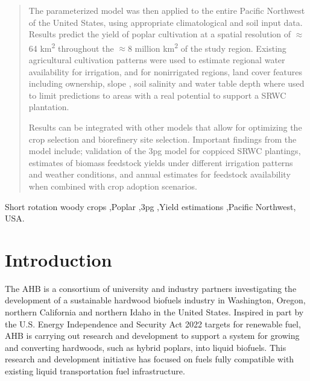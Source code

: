 \documentclass[preprint,12pt]{elsarticle}
\begin{document}
\begin{frontmatter}
\begin{abstract}
  The parameterized model was then applied to the entire Pacific
  Northwest of the United States, using appropriate climatological and
  soil input data.  Results predict the yield of poplar cultivation at
  a spatial resolution of $\approx$ 64 km\textsuperscript{2}
  throughout the $\approx$8 million km\textsuperscript{2} of the study
  region. Existing agricultural cultivation patterns were used to
  estimate regional water availability for irrigation, and for
  nonirrigated regions, land cover features including ownership, slope
  , soil salinity and water table depth where used to limit
  predictions to areas with a real potential to support a \ac{SRWC}
  plantation.

  Results can be integrated with other models that allow for
  optimizing the crop selection and biorefinery site selection.
  Important findings from the model include; validation of the
  \ac{3pg} model for coppiced \ac{SRWC} plantings, estimates of
  biomass feedstock yields under different irrigation patterns and
  weather conditions, and annual estimates for feedstock availability
  when combined with crop adoption scenarios.

\end{abstract}

\begin{keyword}
  Short rotation woody crops \sep Poplar \sep \ac{3pg} \sep Yield
  estimations \sep Pacific Northwest, USA.



\end{keyword}

\end{frontmatter}


\section{Introduction}
\label{sec:introduction}
The \acf{AHB} is a consortium of university and industry partners
investigating the development of a sustainable hardwood biofuels
industry in Washington, Oregon, northern California and northern Idaho
in the United States.  Inspired in part by the U.S. Energy Independence and
Security Act 2022 targets for renewable fuel, \ac{AHB} is carrying out
research and development to support a system for growing and
converting hardwoods, such as hybrid poplars, into liquid biofuels.
This research and development initiative has focused on fuels fully compatible with existing liquid transportation fuel infrastructure.
\end{document}
